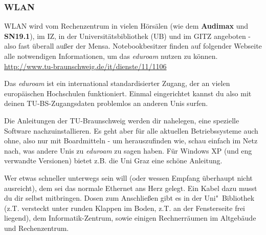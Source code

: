 
	\subsubsection{WLAN}
		\label{wlan}
		WLAN wird vom Rechenzentrum in vielen Hörsälen (wie dem \textbf{Audimax} und \textbf{SN19.1}), im IZ, in der Universitätsbibliothek (UB) und im GITZ angeboten - also fast überall außer der Mensa. Notebookbesitzer finden auf folgender Webseite alle notwendigen Informationen, um das \emph{eduroam} nutzen zu können. \url{http://www.tu-braunschweig.de/it/dienste/11/1106}

		Das \emph{eduroam} ist ein international standardisierter Zugang, der an vielen europäischen Hochschulen funktioniert. Einmal eingerichtet kannst du also mit deinen TU-BS-Zugangsdaten problemlos an anderen Unis surfen.

		Die Anleitungen der TU-Braunschweig werden dir nahelegen, eine spezielle Software nachzuinstallieren. Es geht aber für alle aktuellen Betriebssysteme auch ohne, also nur mit Boardmitteln - um herauszufinden wie, schau einfach im Netz nach, was andere Unis zu \emph{eduroam} zu sagen haben. Für Windows XP (und eng verwandte Versionen) bietet z.B. die Uni Graz eine schöne Anleitung.


		Wer etwas schneller unterwegs sein will (oder wessen
		Empfang überhaupt nicht ausreicht), dem sei das normale
		Ethernet ans Herz gelegt. Ein Kabel dazu musst du dir
		selbst mitbringen. Dosen zum Anschließen gibt es in der
		Uni"~Bibliothek (z.T. versteckt unter runden Klappen im
		Boden, z.T. an der Fensterseite frei liegend), dem
		Informatik-Zentrum, sowie einigen Rechnerräumen im
		Altgebäude und Rechenzentrum.

